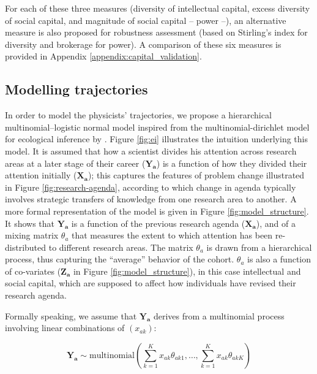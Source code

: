 \documentclass{article}
\begin{document}
For each of these three measures (diversity of intellectual capital, excess diversity of social capital, and magnitude of social capital -- power --), an alternative measure is also proposed for robustness assessment (based on Stirling's index for diversity and brokerage for power). A comparison of these six measures is provided in Appendix \ref{appendix:capital_validation}. 

\subsection{\label{sec:model}Modelling trajectories}

In order to model the physicists' trajectories, we propose a hierarchical multinomial--logistic normal model inspired from the multinomial-dirichlet model for ecological inference by \citet{RosJiaKin01}. Figure \ref{fig:ei} illustrates the intuition underlying this model. It is assumed that how a scientist divides his attention across research areas at a later stage of their career ($\bm{Y_{a}}$) is a function of how they divided their attention initially ($\bm{X_{a}}$); this captures the features of problem change illustrated in Figure \ref{fig:research-agenda}, according to which change in agenda typically involves strategic transfers of knowledge from one research area to another. A more formal representation of the model is given in Figure \ref{fig:model_structure}. It shows that $\bm{Y_{a}}$ is a function of the previous research agenda ($\bm{X_{a}}$), and of a mixing matrix $\theta_a$ that measures the extent to which attention has been re-distributed to different research areas. The matrix $\theta_a$ is drawn from a hierarchical process, thus capturing the ``average'' behavior of the cohort. $\theta_a$ is also a function of co-variates ($\bm{Z_a}$ in Figure \ref{fig:model_structure}), in this case intellectual and social capital, which are supposed to affect how individuals have revised their research agenda. %

Formally speaking, we assume that $\bm{Y_{a}}$ derives from a multinomial process involving linear combinations of $(x_{ak})$:

\begin{equation}
    \bm{Y_a} \sim \text{multinomial}(\sum_{k=1}^{K} x_{ak}\theta_{ak1} ,\dots,\sum_{k=1}^{K}x_{ak}\theta_{akK})
\end{equation}
\end{document}
